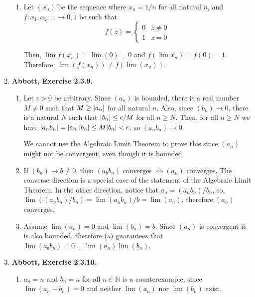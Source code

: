 \documentclass{article}
\DeclarePairedDelimiter\abs{\lvert}{\rvert}
\newcommand{\N}{\mathbb{N}}
\newcommand{\exc}[2][Abbott]{\item \textbf{#1, Exercise #2.}}
\begin{document}
\begin{enumerate}
\begin{enumerate}
		\item Let $(x_n)$ be the sequence where $x_n = 1/n$ for all natural $n$, and $f : {x_1, x_2, \dots} \rightarrow {0, 1}$ be such that \begin{equation*}
		      f(z) = \begin{cases}
		      0 & z \neq 0 \\
		      1 & z = 0
		\end{cases}
		\end{equation*}
						            
		Then, $\lim f(x_n) = \lim (0) = 0$ and $f(\lim x_n) = f(0) = 1$. Therefore, $\lim (f(x_n)) \neq f(\lim(x_n))$.
	\end{enumerate}
			        
	\exc{2.3.9}
	\begin{enumerate}
		\item Let $\epsilon > 0$ be arbitrary. Since $(a_n)$ is bounded, there is a real number $M \neq 0$ such that $M \geq \abs*{a_n}$ for all natural $n$. Also, since $(b_n) \rightarrow 0$, there is a natural $N$ such that $\abs*{b_n} \leq \epsilon/M$ for all $n \geq N$. Then, for all $n \geq N$ we have $\abs*{a_n b_n} = \abs*{a_n} \abs*{b_n} \leq M \abs*{b_n} < \epsilon$, so $(a_n b_n) \rightarrow 0$.
		      		      		      	        
		      We cannot use the Algebraic Limit Theorem to prove this since $(a_n)$ might not be convergent, even though it is bounded.
		      		      		      	        
		\item If $(b_n) \rightarrow b \neq 0$, then $(a_b b_n)$ converges $\iff (a_n)$ converges. The converse direction is a special case of the statement of the Algebraic Limit Theorem. In the other direction, notice that $a_n = (a_n b_n) / b_n$, so, $\lim ((a_n b_n) / b_n) = \lim(a_n b_n) / b = \lim (a_n)$, therefore $(a_n)$ converges.
		      		      		      	        
		\item Assume $\lim (a_n) = 0$ and $\lim (b_n) = b$. Since $(a_n)$ is convergent it is also bounded, therefore (a) guarantees that $\lim(a_b b_n) = 0 = \lim(a_n) \lim(b_n)$.
	\end{enumerate}
				    
	\exc{2.3.10}
	\begin{enumerate}
		\item $a_n = n$ and $b_n = n$ for all $n \in \N$ is a counterexample, since $\lim (a_n - b_n) = 0$ and neither $\lim(a_n)$ nor $\lim(b_n)$ exist.
		      		      		      	     

\end{enumerate}
\end{enumerate}
\end{document}
